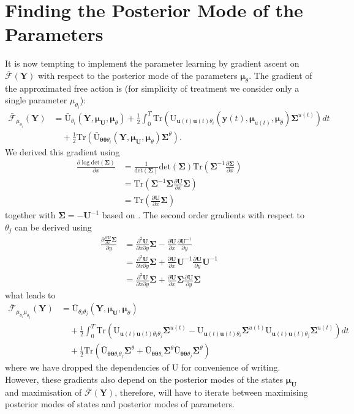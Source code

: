 \documentclass[a4paper,10pt]{article}
\newcommand{\bs}[1]{\mathbf{#1}}					%
\newcommand{\bgs}[1]{\boldsymbol{#1}}				%
\newcommand{\pd}[2]{\frac{\partial #1}{\partial #2}} 	%
\newcommand{\ppd}[3]{\frac{\partial^2 #1}{\partial #2 \partial #3}} %
\newcommand{\trace}[1]{\mathrm{Tr}\left(#1\right)}					%
\renewcommand{\ss}{u}         %
\newcommand{\so}{y}         %
\renewcommand{\sp}{\theta}    %
\newcommand{\ps}{\bs{\ss}}    %
\newcommand{\po}{\bs{\so}}    %
\newcommand{\pp}{\bgs{\sp}} %
\newcommand{\Ps}{\bs{U}}    %
\newcommand{\Po}{\bs{Y}}    %
\newcommand{\U}{\mathrm{U}}			%
\newcommand{\Ua}{\bar{\mathrm{U}}}		%
\newcommand{\Fa}{\bar{\mathcal{F}}}		%
\newcommand{\Cov}{\bgs{\Sigma}}			%
\renewcommand{\det}[1]{\mathrm{det}(#1)}	%
\begin{document}
\section{Finding the Posterior Mode of the Parameters}
It is now tempting to implement the parameter learning by gradient ascent on $\Fa(\Po)$ with respect to the posterior mode of the parameters $\bgs{\mu}_\sp$. The gradient of the approximated free action is (for simplicity of treatment we consider only a single parameter $\mu_{\sp_i}$):
\begin{align}
    \Fa_{\mu_{\sp_i}}(\Po) &= \Ua_{\sp_i}(\Po,\bgs{\mu}_\Ps,\bgs{\mu}_\sp) + \frac{1}{2}\int_0^T \trace{\U_{\ps(t)\ps(t)\sp_i}(\po(t),\bgs{\mu}_{\ss(t)},\bgs{\mu}_\sp)\Cov^{\ss(t)}}dt\nonumber\\
    &\quad \label{eq:approxFreeActionDp} + \frac{1}{2}\trace{\Ua_{\pp\pp\sp_i}(\Po,\bgs{\mu}_\Ps,\bgs{\mu}_\sp)\Cov^\sp}.
\end{align}
We derived this gradient using 
\begin{align}
    \pd{\log \det{\Cov}}{x} &= \frac{1}{\det{\Cov}}\det{\Cov}\trace{\Cov^{-1}\pd{\Cov}{x}}\\
    &= \trace{\Cov^{-1}\Cov\pd{\bs{U}}{x}\Cov}\\
    &= \trace{\pd{\bs{U}}{x}\Cov}
\end{align}
together with $\Cov = -\bs{U}^{-1}$ based on \citep[][eqs. (41) and (53)]{Petersen2008}. The second order gradients with respect to $\sp_j$ can be derived using
\begin{align}
    \pd{\pd{\bs{U}}{x}\Cov}{y} &= \ppd{\bs{U}}{x}{y}\Cov - \pd{\bs{U}}{x}\pd{\bs{U}^{-1}}{y}\\
    &= \ppd{\bs{U}}{x}{y}\Cov + \pd{\bs{U}}{x}\bs{U}^{-1}\pd{\bs{U}}{y}\bs{U}^{-1}\\
    &= \ppd{\bs{U}}{x}{y}\Cov + \pd{\bs{U}}{x}\Cov\pd{\bs{U}}{y}\Cov
\end{align}
what leads to
\begin{align}
    \Fa_{\mu_{\sp_i}\mu_{\sp_j}}(\Po) &= \Ua_{\sp_i\sp_j}(\Po,\bgs{\mu}_\Ps,\bgs{\mu}_\sp) \nonumber\\
    &\quad + \frac{1}{2}\int_0^T \trace{\U_{\ps(t)\ps(t)\sp_i\sp_j}\Cov^{\ss(t)} - \U_{\ps(t)\ps(t)\sp_i}\Cov^{\ss(t)}\U_{\ps(t)\ps(t)\sp_j}\Cov^{\ss(t)}} dt\nonumber\\
    &\quad \label{eq:approxFreeActionDpDp} + \frac{1}{2}\trace{\Ua_{\pp\pp\sp_i\sp_j}\Cov^\sp + \Ua_{\pp\pp\sp_i}\Cov^\sp\Ua_{\pp\pp\sp_j}\Cov^\sp}
\end{align}
where we have dropped the dependencies of $\U$ for convenience of writing. However, these gradients also depend on the posterior modes of the states $\bgs{\mu}_\Ps$ and maximisation of $\Fa(\Po)$, therefore, will have to iterate between maximising posterior modes of states and posterior modes of parameters.
\end{document}
